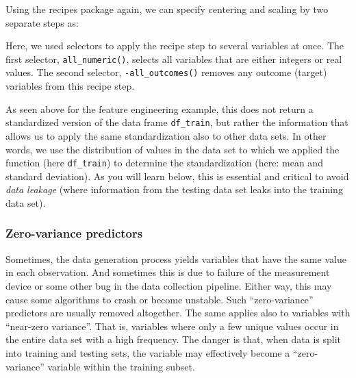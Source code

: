 \documentclass[
]{book}
\newenvironment{Shaded}{\begin{snugshade}}{\end{snugshade}}
\newcommand{\DataTypeTok}[1]{\textcolor[rgb]{0.13,0.29,0.53}{#1}}
\newcommand{\KeywordTok}[1]{\textcolor[rgb]{0.13,0.29,0.53}{\textbf{#1}}}
\newcommand{\NormalTok}[1]{#1}
\newcommand{\OperatorTok}[1]{\textcolor[rgb]{0.81,0.36,0.00}{\textbf{#1}}}
\newcommand{\StringTok}[1]{\textcolor[rgb]{0.31,0.60,0.02}{#1}}
\begin{document}
Using the recipes package again, we can specify centering and scaling by two separate steps as:

\begin{Shaded}
\end{Shaded}

Here, we used selectors to apply the recipe step to several variables at once. The first selector, \texttt{all\_numeric()}, selects all variables that are either integers or real values. The second selector, \texttt{-all\_outcomes()} removes any outcome (target) variables from this recipe step.

As seen above for the feature engineering example, this does not return a standardized version of the data frame \texttt{df\_train}, but rather the information that allows us to apply the same standardization also to other data sets. In other words, we use the distribution of values in the data set to which we applied the function (here \texttt{df\_train}) to determine the standardization (here: mean and standard deviation). As you will learn below, this is essential and critical to avoid \emph{data leakage} (where information from the testing data set leaks into the training data set).

\hypertarget{zero-variance-predictors}{%
\subsubsection{Zero-variance predictors}\label{zero-variance-predictors}}

Sometimes, the data generation process yields variables that have the same value in each observation. And sometimes this is due to failure of the measurement device or some other bug in the data collection pipeline. Either way, this may cause some algorithms to crash or become unstable. Such ``zero-variance'' predictors are usually removed altogether. The same applies also to variables with ``near-zero variance''. That is, variables where only a few unique values occur in the entire data set with a high frequency. The danger is that, when data is split into training and testing sets, the variable may effectively become a ``zero-variance'' variable within the training subset.
\end{document}
